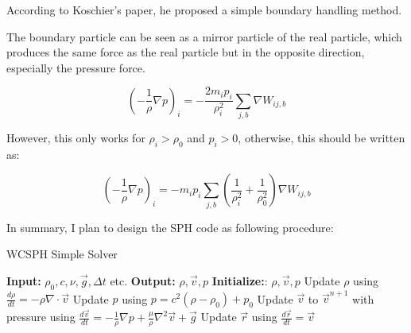 \begin{frame}
    According to Koschier's paper, he proposed a simple boundary handling method.

The boundary particle can be seen as a mirror particle of the real particle, 
which produces the same force as the real particle but in the opposite direction, 
especially the pressure force.

\begin{equation}
    \left(-\frac{1}{\rho}\nabla p\right)_{i}=
    -\frac{2m_{i}p_i}{\rho_{i}^2}\sum_{j,b}\nabla W_{ij,b}
\end{equation}

However, this only works for $\rho_i>\rho_0$ and $p_i>0$,  
otherwise, this should be written as:

\begin{equation}
    \left(-\frac{1}{\rho}\nabla p\right)_{i}=
    -m_ip_i\sum_{j,b}\left(
        \frac{1}{\rho_i^2}+\frac{1}{\rho_0^2}
    \right)
    \nabla W_{ij,b}
\end{equation}

\end{frame}


\begin{frame}
    In summary, 
I plan to design the SPH code as following procedure:

\begin{algorithm}[H]
    \caption{WCSPH Simple Solver}
    \begin{algorithmic}[1]
        \State \textbf{Input:} $\rho_0, c, \nu, \vec{g}, \Delta t$ etc.
        \State \textbf{Output:} $\rho, \vec{v}, p$
        \State \textbf{Initialize:}: $\rho, \vec{v}, p$
                \State Update $\rho$ using $\frac{d\rho}{dt}= -\rho \nabla\cdot \vec{v}$
            \EndFor
                \State Update $p$ using $p = c^2(\rho - \rho_0)+p_0$
            \EndFor
                \State Update $\vec{v}$ to $\vec{v}^{n+1}$ with pressure using $\frac{d\vec{v}}{dt}= -\frac{1}{\rho}\nabla p+\frac{\mu}{\rho} \nabla^2 \vec{v}+\vec{g}$
                \State Update $\vec{r}$ using $\frac{d\vec{r}}{dt}= \vec{v}$
            \EndFor
        \EndWhile
    \end{algorithmic}
\end{algorithm}

\end{frame}

